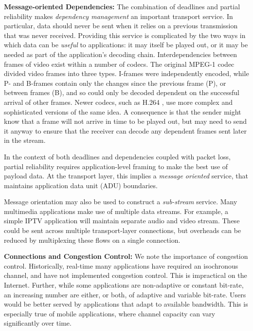 \documentclass{sig-alternate-05-2015}
\begin{document}
\textbf{Message-oriented Dependencies:}
The combination of deadlines and partial reliability makes \emph{dependency
management} an important transport service.
In particular, data should never be sent when it relies on a previous
transmission that was never received. Providing this service is complicated by
the two ways in which data can be \emph{useful} to applications: it may itself
be played out, or it may be needed as part of the application's decoding chain.
Interdependencies between frames of video exist within a number of codecs.
The original MPEG-1 codec \cite{le1991mpeg} divided video frames into three
types. I-frames were independently encoded, while P- and B-frames contain
only the changes since the previous frame (P), or between frames (B), and so
could only be decoded dependent on the successful arrival of other frames.
Newer codecs, such as H.264 \cite{wiegand2003overview}, use more complex
and sophisticated versions of the same idea. 
A consequence is that the sender might know that a frame will not arrive in
time to be played out, but may need to send it anyway to ensure that the
receiver can decode any dependent frames sent later in the stream.

In the context of both deadlines and dependencies coupled with packet loss, partial reliability
requires application-level framing \cite{clark:1990:architecture} to
make the best use of payload data. At the transport
layer, this implies a \emph{message oriented} service, that
maintains application data unit (ADU) boundaries.

Message orientation may also be used to construct a \emph{sub-stream} service.
Many multimedia applications make use of multiple data streams. For example, a
simple IPTV application will maintain separate audio and video stream. These
could be sent across multiple transport-layer connections, but overheads can be
reduced by multiplexing these flows on a single connection.

\textbf{Connections and Congestion Control:}
We note the importance of congestion control. Historically, real-time many
applications have required an isochronous channel, and have not implemented
congestion control. This is impractical on the Internet. Further, while
some applications are non-adaptive or constant bit-rate, an increasing
number are either, or both, of adaptive and variable bit-rate. Users would
be better served by applications that adapt to available bandwidth. This is
especially true of mobile applications, where channel capacity can vary
significantly over time.
\end{document}
